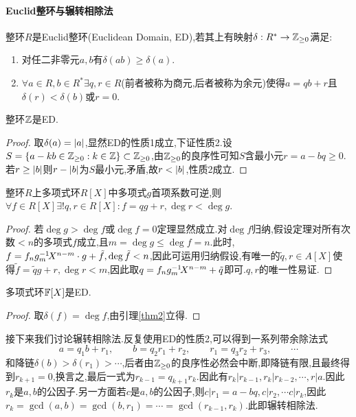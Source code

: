 \documentclass[openany]{book}
\begin{document}
\paragraph{Euclid整环与辗转相除法}
\begin{definition}
    整环$R$是Euclid整环(Euclidean Domain, ED),若其上有映射$\delta:R^*\to \mathbb{Z}_{\geq 0}$满足:\begin{enumerate}
        \item 对任二非零元$a,b$有$\delta(ab)\geq \delta(a)$.
        \item $\forall a\in R,b\in R^*\exists q,r\in R$(前者被称为商元,后者被称为余元)使得$a=qb+r$且$\delta(r)<\delta(b)$或$r=0$.
    \end{enumerate}
\end{definition}
\begin{theorem}
    整环$\mathbb{Z}$是ED.
\end{theorem}
\begin{proof}
    取$\delta(a)=\left|a\right|$,显然ED的性质1成立,下证性质2.设$S=\left\{a-kb\in \mathbb{Z}_{\geq 0}:k\in\mathbb{Z}\right\}\subset \mathbb{Z}_{\geq 0}$,由$\mathbb{Z}_{\geq 0}$的良序性可知$S$含最小元$r=a-bq\geq 0$.若$r\geq \left|b\right|$则$r-\left|b\right|$为$S$最小元,矛盾,故$r<\left|b\right|$,性质2成立.
\end{proof}
\begin{lemma}\label{thm2}
    整环$R$上多项式环$R[X]$中多项式$g$首项系数可逆,则$\forall f\in R[X]\exists!q,r\in R[X]: f=qg+r,\deg r<\deg g$.
\end{lemma}
\begin{proof}
    若$\deg g>\deg f$或$\deg f=0$定理显然成立.对$\deg f$归纳,假设定理对所有次数$<n$的多项式$f$成立,且$m=\deg g\leq \deg f=n$.此时,$f=f_ng_m^{-1}\! X^{n-m}\cdot g+\tilde{f}, \deg\tilde{f}<n$,因此可运用归纳假设,有唯一的$\tilde{q},r\in A[X]$使得$\tilde{f}=\tilde{q}g+r,\deg r<m$,因此取$q=f_ng_m^{-1}\! X^{n-m}+\tilde{q}$即可.$q,r$的唯一性易证.
\end{proof}
\begin{theorem}
    多项式环$\mathbb{F}[X]$是ED.
\end{theorem}
\begin{proof}
    取$\delta(f)=\deg f$,由引理\ref{thm2}立得.
\end{proof}
接下来我们讨论辗转相除法.反复使用ED的性质2,可以得到一系列带余除法式
$$a=q_1b+r_1,\qquad b=q_2r_1+r_2,\qquad r_1=q_3r_2+r_3,\qquad \cdots$$
和降链$\delta(b)>\delta(r_1)>\cdots$,后者由$\mathbb{Z}_{\geq 0}$的良序性必然会中断,即降链有限,且最终得到$r_{k+1}=0$,换言之,最后一式为$r_{k-1}=q_{k+1}r_k$.因此有$r_k|r_{k-1},r_k|r_{k-2},\cdots,r|a$.因此$r_k$是$a,b$的公因子.另一方面若$c$是$a,b$的公因子,则$c|r_1=a-bq, c|r_2,\cdots c|r_k$,因此$r_k=\gcd(a,b)=\gcd(b,r_1)=\cdots=\gcd(r_{k-1},r_k)$.此即辗转相除法.
\end{document}
